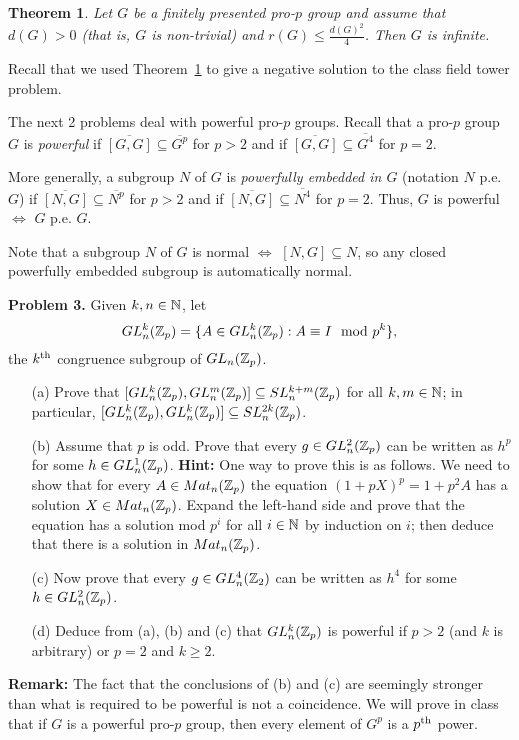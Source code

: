 \documentclass[12pt]{amsart}
\newtheorem {Theorem}    {Theorem}
\begin{document}
\begin{Theorem} 
\label{GS2}
Let $G$ be a finitely presented pro-$p$ group and assume that
$d(G)>0$ (that is, $G$ is non-trivial) and $r(G)\leq \frac{d(G)^2}{4}$. Then $G$ is infinite.
\end{Theorem}
Recall that we used Theorem~\ref{GS2} to give a negative solution to the class field tower problem.

\skv
The next 2 problems deal with powerful pro-$p$ groups. Recall that a pro-$p$ group 
$G$ is {\it powerful} if $\overline{[G,G]}\subseteq \overline{G^p}$ for $p>2$ and
if $\overline{[G,G]}\subseteq \overline{G^4}$ for $p=2$.

More generally, a subgroup $N$ of $G$ is {\it powerfully embedded in $G$} (notation
$N$ p.e. $G$) if $\overline{[N,G]}\subseteq \overline{N^p}$ for $p>2$ and
if $\overline{[N,G]}\subseteq \overline{N^4}$ for $p=2$. Thus, $G$ is powerful
$\iff$ $G$ p.e. $G$.

Note that a subgroup $N$ of $G$ is normal $\iff$ $[N,G]\subseteq N$, so any closed powerfully
embedded subgroup is automatically normal.

\skv
\noindent
{\bf Problem 3.} Given $k,n\in{\mathbb N}$, let 
$$GL_n^k({\mathbb Z}_p)=\{A\in GL_n^k({\mathbb Z}_p) : A\equiv I\mod p^k\},$$ the $k^{\rm th}$
congruence subgroup of $GL_n({\mathbb Z}_p)$.
\begin{itemize}
\item[(a)] Prove that $[GL_n^k({\mathbb Z}_p),GL_n^m({\mathbb Z}_p)]\subseteq SL_n^{k+m}({\mathbb Z}_p)$
for all $k,m\in{\mathbb N}$; in particular, $[GL_n^k({\mathbb Z}_p),GL_n^k({\mathbb Z}_p)]\subseteq SL_n^{2k}({\mathbb Z}_p)$.
\item[(b)] Assume that $p$ is odd. Prove that every $g\in GL_n^2({\mathbb Z}_p)$ 
can be written as $h^p$ for some $h\in GL_n^1({\mathbb Z}_p)$. {\bf Hint:} One way to prove this is as follows. We need to show that for every $A\in Mat_n({\mathbb Z}_p)$ the equation
$(1+pX)^p=1+p^2A$ has a solution $X\in Mat_n({\mathbb Z}_p)$. Expand the left-hand side
and prove that the equation has a solution mod $p^i$ for all $i\in{\mathbb N}$ by induction on $i$; then deduce that there is a solution in $Mat_n({\mathbb Z}_p)$.
\item[(c)] Now prove that every $g\in GL_n^4({\mathbb Z}_2)$ 
can be written as $h^4$ for some $h\in GL_n^2({\mathbb Z}_p)$.
\item[(d)] Deduce from (a), (b) and (c) that $GL_n^k({\mathbb Z}_p)$ is powerful
if $p>2$ (and $k$ is arbitrary) or $p=2$ and $k\geq 2$.
\end{itemize}
{\bf Remark:} The fact that the conclusions of (b) and (c) are seemingly stronger
than what is required to be powerful is not a coincidence. We will prove in class that if $G$ is a powerful pro-$p$ group, then every element of $G^p$ is a $p^{\rm th}$ power.
\end{document}
